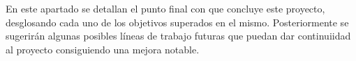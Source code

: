 \begin{comment}
Todo proyecto debe incluir las conclusiones que se derivan de su desarrollo. Éstas pueden ser de diferente índole, dependiendo de la tipología del proyecto, pero normalmente van a estar presentes un conjunto de conclusiones relacionadas con los resultados del proyecto y un conjunto de conclusiones técnicas. 
Además, resulta muy útil realizar un informe crítico indicando cómo se puede mejorar el proyecto, o cómo se puede continuar trabajando en la línea del proyecto realizado. 
\end{comment}


En este apartado se detallan el punto final con que concluye este proyecto, desglosando cada uno de los objetivos superados en el mismo. Posteriormente se sugerirán algunas posibles líneas de trabajo futuras que puedan dar continuiidad al proyecto consiguiendo una mejora notable.


